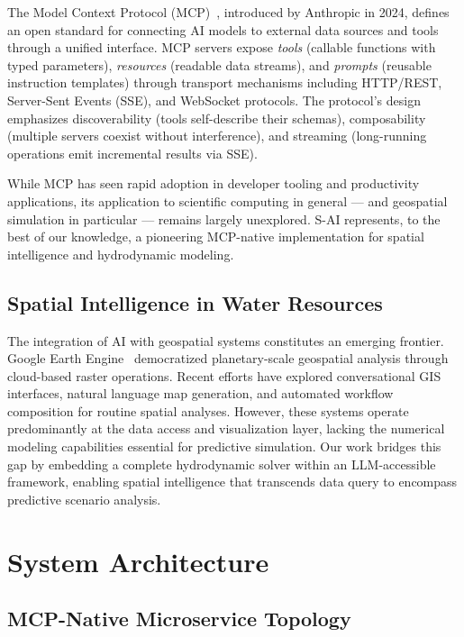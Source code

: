 \documentclass[11pt, a4paper]{article}
\begin{document}
The Model Context Protocol (MCP)~\cite{mcp2024}, introduced by Anthropic in 2024, defines an open standard for connecting AI models to external data sources and tools through a unified interface. MCP servers expose \emph{tools} (callable functions with typed parameters), \emph{resources} (readable data streams), and \emph{prompts} (reusable instruction templates) through transport mechanisms including HTTP/REST, Server-Sent Events (SSE), and WebSocket protocols. The protocol's design emphasizes discoverability (tools self-describe their schemas), composability (multiple servers coexist without interference), and streaming (long-running operations emit incremental results via SSE).

While MCP has seen rapid adoption in developer tooling and productivity applications, its application to scientific computing in general --- and geospatial simulation in particular --- remains largely unexplored. S-AI represents, to the best of our knowledge, a pioneering MCP-native implementation for spatial intelligence and hydrodynamic modeling.

\subsection{Spatial Intelligence in Water Resources}

The integration of AI with geospatial systems constitutes an emerging frontier. Google Earth Engine~\cite{googleearthengine} democratized planetary-scale geospatial analysis through cloud-based raster operations. Recent efforts have explored conversational GIS interfaces, natural language map generation, and automated workflow composition for routine spatial analyses. However, these systems operate predominantly at the data access and visualization layer, lacking the numerical modeling capabilities essential for predictive simulation. Our work bridges this gap by embedding a complete hydrodynamic solver within an LLM-accessible framework, enabling spatial intelligence that transcends data query to encompass predictive scenario analysis.

\section{System Architecture}
\label{sec:arch}

\subsection{MCP-Native Microservice Topology}
\end{document}
